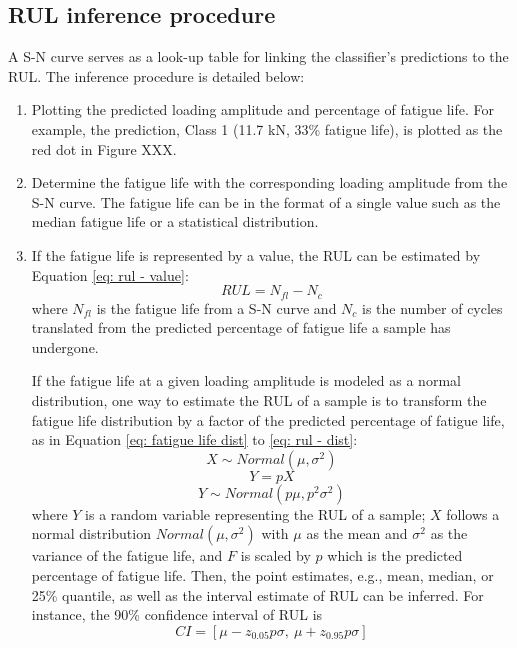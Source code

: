 \subsection{RUL inference procedure}
A S-N curve serves as a look-up table for linking the classifier's predictions to the RUL. The inference procedure is detailed below:
\begin{enumerate}
    \item Plotting the predicted loading amplitude and percentage of fatigue life. For example, the prediction, Class 1 (11.7 kN, 33\% fatigue life), is plotted as the red dot in Figure XXX.
    \item Determine the fatigue life with the corresponding loading amplitude from the S-N curve. The fatigue life can be in the format of a single value such as the median fatigue life or a statistical distribution.
    \item If the fatigue life is represented by a value, the RUL can be estimated by Equation \eqref{eq: rul - value}: 
    \begin{equation}
        \label{eq: rul - value}
        RUL = N_{fl} - N_{c}
    \end{equation}
    where $N_{fl}$ is the fatigue life from a S-N curve and $N_c$ is the number of cycles translated from the predicted percentage of fatigue life a sample has undergone.

    If the fatigue life at a given loading amplitude is modeled as a normal distribution, one way to estimate the RUL of a sample is to transform the fatigue life distribution by a factor of the predicted percentage of fatigue life, as in Equation \eqref{eq: fatigue life dist} to \eqref{eq: rul - dist}:
    \begin{equation}
        \label{eq: fatigue life dist}
        X \sim Normal(\mu, \sigma^2)
    \end{equation}
    \begin{equation}
        \label{eq: rul transform}
        Y = pX
    \end{equation}
    \begin{equation}
        \label{eq: rul - dist}
        Y \sim Normal(p\mu, p^2\sigma^2)
    \end{equation}
    where $Y$ is a random variable representing the RUL of a sample; $X$ follows a normal distribution $Normal (\mu, \sigma^2)$ with $\mu$ as the mean and $\sigma^2$ as the variance of the fatigue life, and $F$ is scaled by $p$ which is the predicted percentage of fatigue life. Then, the point estimates, e.g., mean, median, or 25\% quantile, as well as the interval estimate of RUL can be inferred. For instance, the 90\% confidence interval of RUL is
    \begin{equation}
        CI = [\mu - z_{0.05} p \sigma,\ \mu + z_{0.95} p \sigma]
    \end{equation}
\end{enumerate}


